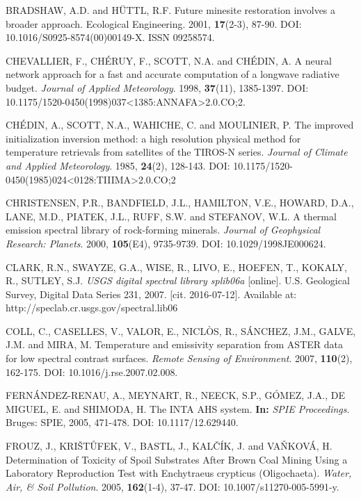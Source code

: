 \begin{thebibliography}{10}
 BRADSHAW, A.D. and HÜTTL, R.F. Future minesite restoration involves a broader approach. Ecological Engineering. 2001, \textbf{17}(2-3), 87-90. DOI: 10.1016/S0925-8574(00)00149-X. ISSN 09258574.

 CHEVALLIER, F., CHÉRUY, F., SCOTT, N.A. and CHÉDIN, A. A neural network approach for a fast and accurate computation of a longwave radiative budget. \textit{Journal of Applied Meteorology}. 1998, \textbf{37}(11), 1385-1397. DOI: 10.1175/1520-0450(1998)037<1385:ANNAFA>2.0.CO;2.

 CHÉDIN, A., SCOTT, N.A., WAHICHE, C. and MOULINIER, P. The improved initialization inversion method: a high resolution physical method for temperature retrievals from satellites of the TIROS-N series. \textit{Journal of Climate and Applied Meteorology}. 1985, \textbf{24}(2), 128-143. DOI: 10.1175/1520-0450(1985)024<0128:TIIIMA>2.0.CO;2

 CHRISTENSEN, P.R., BANDFIELD, J.L., HAMILTON, V.E., HOWARD, D.A., LANE, M.D., PIATEK, J.L., RUFF, S.W. and STEFANOV, W.L. A thermal emission spectral library of rock-forming minerals. \textit{Journal of Geophysical Research: Planets}. 2000, \textbf{105}(E4), 9735-9739. DOI: 10.1029/1998JE000624.

 CLARK, R.N., SWAYZE, G.A., WISE, R., LIVO, E., HOEFEN, T., KOKALY, R., SUTLEY, S.J. \textit{USGS digital spectral library splib06a} [online]. U.S. Geological Survey, Digital Data Series 231, 2007. [cit. 2016-07-12]. Available at: http://speclab.cr.usgs.gov/spectral.lib06

 COLL, C., CASELLES, V., VALOR, E., NICLÒS, R., SÁNCHEZ, J.M., GALVE, J.M. and MIRA, M. Temperature and emissivity separation from ASTER data for low spectral contrast surfaces. \textit{Remote Sensing of Environment}. 2007, \textbf{110}(2), 162-175. DOI: 10.1016/j.rse.2007.02.008. 

 FERNÁNDEZ-RENAU, A., MEYNART, R., NEECK, S.P., GÓMEZ, J.A., DE MIGUEL, E. and SHIMODA, H. The INTA AHS system. \textbf{In:} \textit{SPIE Proceedings}. Bruges: SPIE, 2005, 471-478. DOI: 10.1117/12.629440.

 FROUZ, J., KRIŠTŮFEK, V., BASTL, J., KALČÍK, J. and VAŇKOVÁ, H. Determination of Toxicity of Spoil Substrates After Brown Coal Mining Using a Laboratory Reproduction Test with Enchytraeus crypticus (Oligochaeta). \textit{Water, Air, \& Soil Pollution}. 2005, \textbf{162}(1-4), 37-47. DOI: 10.1007/s11270-005-5991-y. 


\end{thebibliography}

